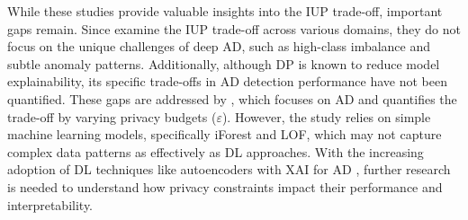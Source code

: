 While these studies provide valuable insights into the IUP trade-off, important gaps remain. Since \cite{saifullah2022privacy} examine the IUP trade-off across various domains, they do not focus on the unique challenges of deep AD, such as high-class imbalance and subtle anomaly patterns. Additionally, although DP is known to reduce model explainability, its specific trade-offs in AD detection performance have not been quantified. These gaps are addressed by \cite{ezzeddine2024differential}, which focuses on AD and quantifies the trade-off by varying privacy budgets ($\varepsilon$). However, the study relies on simple machine learning models, specifically iForest and LOF, which may not capture complex data patterns as effectively as DL approaches. With the increasing adoption of DL techniques like autoencoders with XAI for AD \citep{li2023survey}, further research is needed to understand how privacy constraints impact their performance and interpretability.

